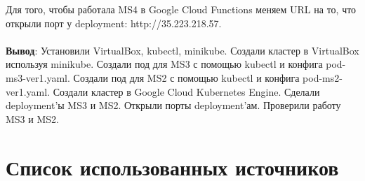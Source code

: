 \documentclass[12pt, a4paper, simple]{eskdtext}
\begin{document}
  Для того, чтобы работала MS4 в Google Cloud Functions меняем URL на то, что открыли порт у deployment:
  http://35.223.218.57.

  \paragraph{} \textbf{Вывод}:
  Установили VirtualBox, kubectl, minikube.
  Создали кластер в VirtualBox используя minikube.
  Создали под для MS3 с помощью kubectl и конфига pod-ms3-ver1.yaml.
  Создали под для MS2 с помощью kubectl и конфига pod-ms2-ver1.yaml.
  Создали кластер в Google Cloud Kubernetes Engine.
  Сделали deployment'ы MS3 и MS2.
  Открыли порты deployment'ам.
  Проверили работу MS3 и MS2.

  \newpage
  \begingroup
    \section*{Список использованных источников} %

    \renewcommand{\addcontentsline}[3]{}%
    \renewcommand{\section}[2]{}%
\end{document}

